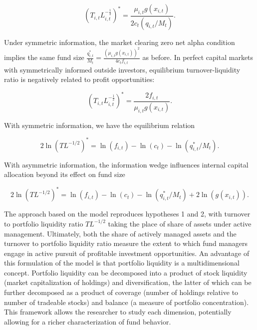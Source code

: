 \documentclass[openany]{book}
\theoremstyle{definition}
\theoremstyle{definition}
\theoremstyle{definition}
\theoremstyle{remark}
\begin{document}
\begin{equation}
(T_{i,t}L_{i,t}^{-\frac{1}{2}})^\ast = \frac{\mu_{i,t}g(x_{i,t})}{2c_t(q_{i,t}/M_t)}.
\label{eq:PSTfoc}
\end{equation}

Under symmetric information, the market clearing zero net alpha
condition implies the same fund size
\(\frac{q_{i,t}^\ast}{M_t}=\frac{(\mu_{i,t}g(x_{i,t}))^2}{4c_t f_{i,t}}\)
as before. In perfect capital markets with symmetrically informed
outside investors, equilibrium turnover-liquidity ratio is negatively
related to profit opportunities:

\begin{equation}
(T_{i,t}L_{i,t}^{-\frac{1}{2}})^\ast=\frac{2f_{i,t}}{\mu_{i,t}g(x_{i,t})}.
\label{eq:PSTcapMkt}
\end{equation}

With symmetric information, we have the equilibrium relation

\begin{equation}
2\ln(TL^{-1/2})^\ast=\ln(f_{i,t}) - \ln(c_t) - \ln(q^\ast_{i,t}/M_t).
\label{eq:csEqTL}
\end{equation}

With asymmetric information, the information wedge influences internal
capital allocation beyond its effect on fund size

\begin{equation}
2\ln(TL^{-1/2})^\ast=\ln(f_{i,t}) - \ln(c_t) - \ln(q^\ast_{i,t}/M_t)+2\ln(g(x_{i,t})).
\label{eq:csEqaTL}
\end{equation}

The approach based on the \citet{pst17L} model reproduces hypotheses 1
and 2, with turnover to portfolio liquidity ratio \(TL^{-1/2}\) taking
the place of share of assets under active management. Ultimately, both
the share of actively managed assets and the turnover to portfolio
liquidity ratio measure the extent to which fund managers engage in
active pursuit of profitable investment opportunities. An advantage of
this formulation of the model is that portfolio liquidity is a
multidimensional concept. Portfolio liquidity can be decomposed into a
product of stock liquidity (market capitalization of holdings) and
diversification, the latter of which can be further decomposed as a
product of coverage (number of holdings relative to number of tradeable
stocks) and balance (a measure of portfolio concentration). This
framework allows the researcher to study each dimension, potentially
allowing for a richer characterization of fund behavior.
\end{document}
